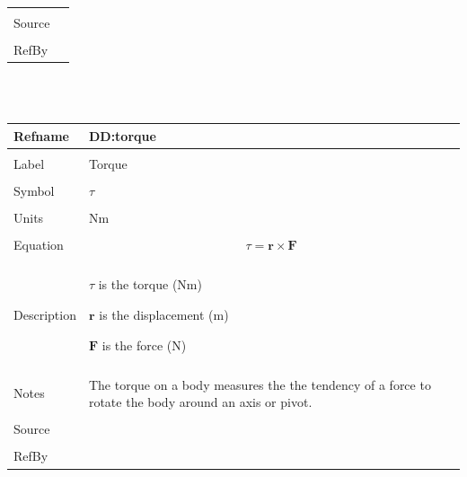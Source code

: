 \documentclass[12pt]{article}
\begin{document}
\begin{minipage}{\textwidth}
\begin{tabular}{p{} p{}}
                                                          \\ \midrule \\
                                                          Source & \\ \midrule \\
                                                                   RefBy & 
\\ \bottomrule \end{tabular}
\end{minipage}\\
~\newline
 \noindent \begin{minipage}{\textwidth}
\begin{tabular}{p{} p{}}
\toprule \textbf{Refname} & \textbf{DD:torque}
\label{DD:torque}
\\ \midrule \\
Label & Torque
        \\ \midrule \\
        Symbol & $τ$
                 \\ \midrule \\
                 Units & Nm
                         \\ \midrule \\
                         Equation & \begin{displaymath}
                                    τ=\mathbf{r}\times\mathbf{F}
                                    \end{displaymath}
                                    \\ \midrule \\
                                    Description & \begin{symbDescription}
                                                  \item{$τ$ is the torque (Nm)}
                                                  \item{$\mathbf{r}$ is the displacement (m)}
                                                  \item{$\mathbf{F}$ is the force (N)}
                                                  \end{symbDescription}
                                                  \\ \midrule \\
                                                  Notes & The torque on a body measures the the tendency of a force to rotate the body around an axis or pivot.
                                                          \\ \midrule \\
                                                          Source & \\ \midrule \\
                                                                   RefBy & 
\\ \bottomrule \end{tabular}
\end{minipage}\\
\end{document}
